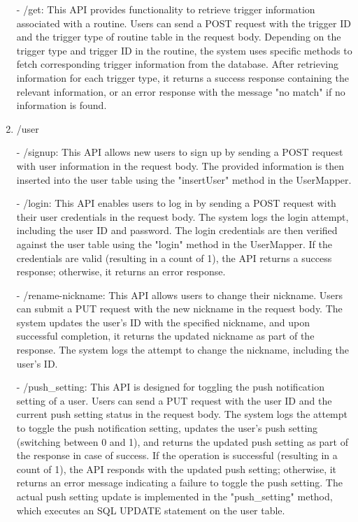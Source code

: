 \begin{enumerate}
    \item[-] /get: This API provides functionality to retrieve trigger information associated with a routine. Users can send a POST request with the trigger ID and the trigger type of routine table in the request body. Depending on the trigger type and trigger ID in the routine, the system uses specific methods to fetch corresponding trigger information from the database. After retrieving information for each trigger type, it returns a success response containing the relevant information, or an error response with the message "no match" if no information is found.\\

    \item /user
    \item[-] /signup: This API allows new users to sign up by sending a POST request with user information in the request body. The provided information is then inserted into the user table using the "insertUser" method in the UserMapper.\\
    \item[-] /login: This API enables users to log in by sending a POST request with their user credentials in the request body. The system logs the login attempt, including the user ID and password. The login credentials are then verified against the user table using the "login" method in the UserMapper. If the credentials are valid (resulting in a count of 1), the API returns a success response; otherwise, it returns an error response.\\
    \item[-] /rename-nickname: This API allows users to change their nickname. Users can submit a PUT request with the new nickname in the request body. The system updates the user's ID with the specified nickname, and upon successful completion, it returns the updated nickname as part of the response. The system logs the attempt to change the nickname, including the user's ID.\\
    \item[-] /push\_setting: This API is designed for toggling the push notification setting of a user. Users can send a PUT request with the user ID and the current push setting status in the request body. The system logs the attempt to toggle the push notification setting, updates the user's push setting (switching between 0 and 1), and returns the updated push setting as part of the response in case of success. If the operation is successful (resulting in a count of 1), the API responds with the updated push setting; otherwise, it returns an error message indicating a failure to toggle the push setting. The actual push setting update is implemented in the "push\_setting" method, which executes an SQL UPDATE statement on the user table.\\
\end{enumerate}
